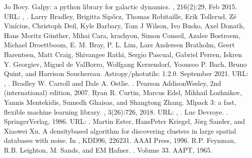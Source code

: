 \documentclass[letterpaper,10pt,english]{sphinxmanual}
\begin{document}
\begin{sphinxthebibliography}{10}
\sphinxAtStartPar
Jo Bovy. Galpy: a python library for galactic dynamics. , 216(2):29, Feb 2015. URL: , .
\sphinxAtStartPar
Larry Bradley, Brigitta Sipőcz, Thomas Robitaille, Erik Tollerud, Zé Vinícius, Christoph Deil, Kyle Barbary, Tom J Wilson, Ivo Busko, Axel Donath, Hans Moritz Günther, Mihai Cara, krachyon, Simon Conseil, Azalee Bostroem, Michael Droettboom, E. M. Bray, P. L. Lim, Lars Andersen Bratholm, Geert Barentsen, Matt Craig, Shivangee Rathi, Sergio Pascual, Gabriel Perren, Iskren Y. Georgiev, Miguel de Val\sphinxhyphen{}Borro, Wolfgang Kerzendorf, Yoonsoo P. Bach, Bruno Quint, and Harrison Souchereau. Astropy/photutils: 1.2.0. September 2021. URL: , .
\sphinxAtStartPar
Bradley W. Carroll and Dale A. Ostlie. . Pearson Addison\sphinxhyphen{}Wesley, 2nd (international) edition, 2007.
\sphinxAtStartPar
Ryan R. Curtin, Marcus Edel, Mikhail Lozhnikov, Yannis Mentekidis, Sumedh Ghaisas, and Shangtong Zhang. Mlpack 3: a fast, flexible machine learning library. , 3(26):726, 2018. URL: , .
\sphinxAtStartPar
Luc Devroye. . Springer\sphinxhyphen{}Verlag, 1986. URL: .
\sphinxAtStartPar
Martin Ester, Hans\sphinxhyphen{}Peter Kriegel, Jörg Sander, and Xiaowei Xu. A density\sphinxhyphen{}based algorithm for discovering clusters in large spatial databases with noise. In , KDD\textquotesingle{}96, 226\textendash{}231. AAAI Press, 1996.
\sphinxAtStartPar
R.P. Feynman, R.B. Leighton, M. Sands, and EM Hafner. . Volume 33. AAPT, 1965.

\end{sphinxthebibliography}
\end{document}
